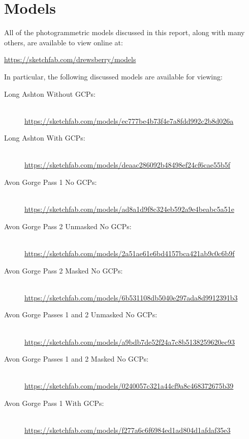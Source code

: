\section{Models}

All of the photogrammetric models discussed in this report, along with many
others, are available to view online at:

\url{https://sketchfab.com/drewsberry/models}

In particular, the following discussed models are available for viewing:

\begin{description}
    \item[Long Ashton Without GCPs:] \hfill \\
        \url{https://sketchfab.com/models/ec777be4b73f4e7a8fdd992c2b8d026a}
    \item[Long Ashton With GCPs:] \hfill \\
        \url{https://sketchfab.com/models/deaac286092b48498ef24cf6cae55b5f}
    \item[Avon Gorge Pass 1 No GCPs:] \hfill \\
        \url{https://sketchfab.com/models/ad8a1d9f8c324eb592a9e4beabc5a51e}
    \item[Avon Gorge Pass 2 Unmasked No GCPs:] \hfill \\
        \url{https://sketchfab.com/models/2a51ae61e6bd4157bca421ab9c0c6b9f}
    \item[Avon Gorge Pass 2 Masked No GCPs:] \hfill \\
        \url{https://sketchfab.com/models/6b531108db5040e297ada8d9912391b3}
    \item[Avon Gorge Passes 1 and 2 Unmasked No GCPs:] \hfill \\
        \url{https://sketchfab.com/models/a9bdb7de52f24a7c8b5138259620ec93}
    \item[Avon Gorge Passes 1 and 2 Masked No GCPs:] \hfill \\
        \url{https://sketchfab.com/models/0240057c321a44cf9a8c468372675b39}
    \item[Avon Gorge Pass 1 With GCPs:] \hfill \\
        \url{https://sketchfab.com/models/f277a6c6f6984ed1ad804d1afdaf35e3}
\end{description}
